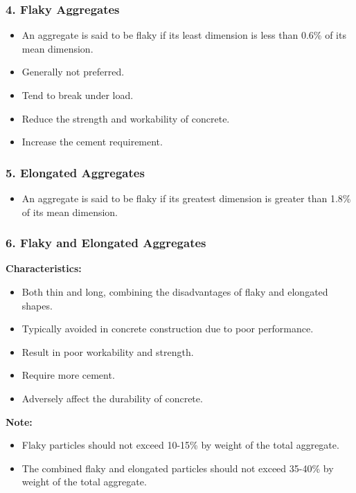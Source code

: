\documentclass[a4paper,11pt]{book}
\begin{document}
\subsubsection*{4. Flaky Aggregates}

\begin{itemize}
    \item An aggregate is said to be flaky if its least dimension is less than 0.6\% of its mean dimension.
    \item Generally not preferred.
        \item Tend to break under load.
    \item Reduce the strength and workability of concrete.
    \item Increase the cement requirement.
\end{itemize}


\subsubsection*{5. Elongated Aggregates}
\begin{itemize}
    \item An aggregate is said to be flaky if its greatest dimension is greater than 1.8\% of its mean dimension.
\end{itemize}


\subsubsection*{6. Flaky and Elongated Aggregates}
\textbf{Characteristics:}
\begin{itemize}
    \item Both thin and long, combining the disadvantages of flaky and elongated shapes.
    \item Typically avoided in concrete construction due to poor performance.
        \item Result in poor workability and strength.
    \item Require more cement.
    \item Adversely affect the durability of concrete.
\end{itemize}

\textbf{Note:}
\begin{itemize}
    \item Flaky particles should not exceed 10-15\% by weight of the total aggregate.
    \item The combined flaky and elongated particles should not exceed 35-40\% by weight of the total aggregate.
\end{itemize}
\end{document}
